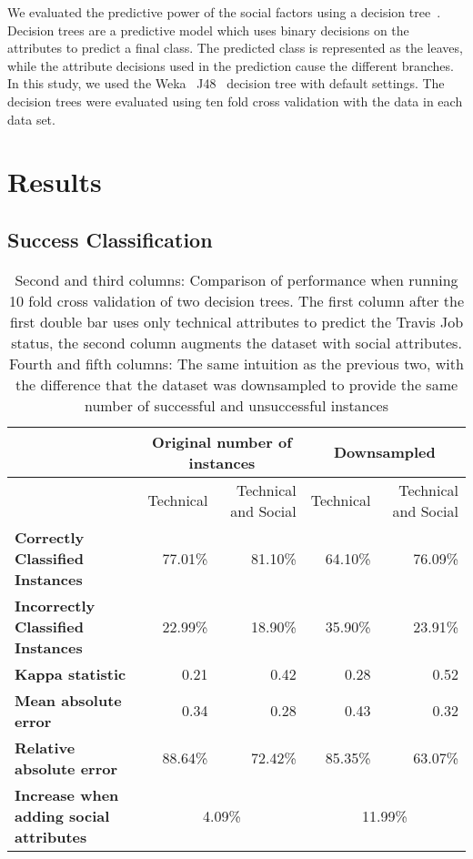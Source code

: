 \documentclass[10pt, conference]{IEEEtran}
\begin{document}
We evaluated the predictive power of the social factors using a decision
tree~\cite{Quinlan86}.
Decision trees are a predictive model which uses binary decisions on the
attributes to predict a final class.  The predicted class is represented as the
leaves, while the attribute decisions used in the prediction cause the
different branches.
In this study, we used the Weka~\cite{Weka} J48~\cite{Quinlan1993} decision tree
with default settings. The decision trees were evaluated using ten fold cross 
validation with the data in each data set.

\section{Results}

\subsection{Success Classification}
\begin{table*}[ht]
\centering
\begin{tabular}{l||r|r||r|r}
  & \multicolumn{2}{|c||}{Original number of instances}  & \multicolumn{2}{|c}{Downsampled} \\
\hline
  & Technical & Technical and Social & Technical & Technical and Social \\
\hline
\textbf{Correctly Classified Instances}&  77.01\% & 81.10\%  & 64.10\% & 76.09\%\\

\textbf{Incorrectly Classified Instances}&  22.99\% & 18.90\% & 35.90\% & 23.91\%\\

\textbf{Kappa statistic}& 0.21 &  0.42 & 0.28  & 0.52 \\

\textbf{Mean absolute error}& 0.34 &  0.28 & 0.43 & 0.32\\

\textbf{Relative absolute error}& 88.64\% & 72.42\%  & 85.35\% & 63.07\%\\
\hline
\textbf{Increase when adding social attributes}& \multicolumn{2}{|c||}{4.09\%}  & \multicolumn{2}{|c}{11.99\%}\\

\hline
\end{tabular}
\\
\center
  \caption{ Second and third columns: Comparison of performance when running 10 fold cross validation of two decision trees. The first column after the first double bar uses only technical attributes to predict the Travis Job status, the second column augments the dataset with social attributes. Fourth and fifth columns: The same intuition as the previous two, with the difference that the dataset was downsampled to provide the same number of successful and unsuccessful instances }
  \label{resultsTable}
\end{table*} 
\end{document}
